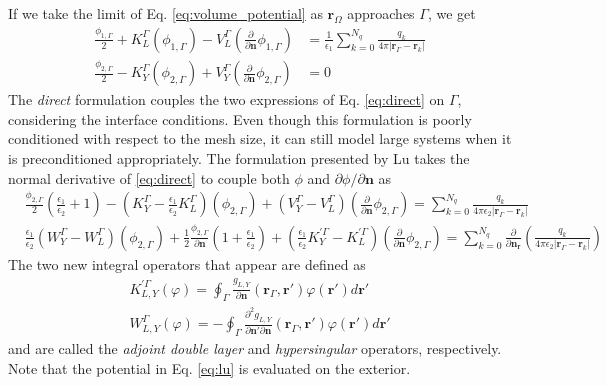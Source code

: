 If we take the limit of Eq. \eqref{eq:volume_potential} as $\mathbf{r}_{\Omega}$ approaches $\Gamma$, we get
%
\begin{align} \label{eq:direct}
\frac{\phi_{1,\Gamma}}{2}+ K_{L}^{\Gamma}(\phi_{1,\Gamma}) -  V_{L}^{\Gamma} \left(\frac{\partial}{\partial \mathbf{n}}  \phi_{1,\Gamma}  \right) & = \frac{1}{\epsilon_1} \sum_{k=0}^{N_q}  \frac{q_k}{4\pi|\mathbf{r}_{\Gamma} - \mathbf{r}_k|} \nonumber \\
\frac{\phi_{2,\Gamma}}{2} - K_{Y}^{\Gamma}(\phi_{2,\Gamma}) + V_{Y}^{\Gamma} \left( \frac{\partial}{\partial \mathbf{n}} \phi_{2,\Gamma} \right) & = 0
\end{align}
%
The {\it direct} formulation\cite{YoonLenhoff1990} couples the two expressions of Eq. \eqref{eq:direct} on $\Gamma$, considering the interface conditions. Even though this formulation is poorly conditioned with respect to the mesh size, it can still model large systems when it is preconditioned appropriately.\cite{AltmanBardhanWhiteTidor09,MartinezETal2019,wang2021high} 
The formulation presented by Lu\cite{LuETal2006} takes the normal derivative of \eqref{eq:direct} to couple both $\phi$ and $\partial\phi/\partial\mathbf{n}$ as
%
\begin{align}\label{eq:lu}
    & \frac{\phi_{2,\Gamma}}{2}\left(\frac{\epsilon_1}{\epsilon_2}+1\right) - \left(K_Y^\Gamma - \frac{\epsilon_1}{\epsilon_2}K_L^\Gamma\right)(\phi_{2,\Gamma}) + \left(V_Y^\Gamma - V_L^\Gamma\right)\left( \frac{\partial}{\partial \mathbf{n}} \phi_{2,\Gamma} \right) = \sum_{k=0}^{N_q}  \frac{q_k}{4\pi\epsilon_2|\mathbf{r}_{\Gamma} - \mathbf{r}_k|}
     \nonumber \\
    &\frac{\epsilon_1}{\epsilon_2}\left(W_Y^\Gamma - W_L^\Gamma\right)(\phi_{2,\Gamma}) +  \frac{1}{2}\frac{\phi_{2,\Gamma}}{\partial\mathbf{n}}\left(1+\frac{\epsilon_1}{\epsilon_2}\right) + \left(\frac{\epsilon_1}{\epsilon_2}K_Y^{\prime\Gamma} - K_L^{\prime\Gamma}\right)\left( \frac{\partial}{\partial \mathbf{n}} \phi_{2,\Gamma} \right) = \sum_{k=0}^{N_q}  \frac{\partial}{\partial\mathbf{n}_\mathbf{r}}\left(\frac{q_k}{4\pi\epsilon_2|\mathbf{r}_{\Gamma} - \mathbf{r}_k|}\right)
\end{align}
%
The two new integral operators that appear are defined as 
%
\begin{align}\label{eq:adj_hyp}
K^{\prime\Gamma}_{L,Y}(\varphi) = \oint_\Gamma \frac{g_{L,Y}}{\partial\mathbf{n}}(\mathbf{r}_\Gamma,\mathbf{r}')\varphi(\mathbf{r}')d\mathbf{r}'\nonumber\\
W^\Gamma_{L,Y}(\varphi) = - \oint_\Gamma \frac{\partial^2 g_{L,Y}}{\partial\mathbf{n}'\partial\mathbf{n}}(\mathbf{r}_\Gamma,\mathbf{r}')\varphi(\mathbf{r}')d\mathbf{r}'
\end{align}
%
and are called the {\it  adjoint double layer} and {\it hypersingular} operators, respectively. Note that the potential in Eq. \eqref{eq:lu} is evaluated on the exterior. 

